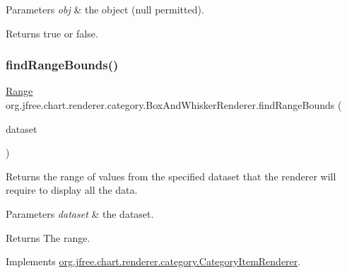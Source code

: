 \begin{DoxyParams}{Parameters}
{\em obj} & the object ({\ttfamily null} permitted).\\
\hline
\end{DoxyParams}
\begin{DoxyReturn}{Returns}
{\ttfamily true} or {\ttfamily false}. 
\end{DoxyReturn}
\mbox{\label{classorg_1_1jfree_1_1chart_1_1renderer_1_1category_1_1_box_and_whisker_renderer_a75d2ee53086dc5242430580069ab9370}} 
\subsubsection{\texorpdfstring{find\+Range\+Bounds()}{findRangeBounds()}}
{\footnotesize\ttfamily \mbox{\hyperlink{classorg_1_1jfree_1_1data_1_1_range}{Range}} org.\+jfree.\+chart.\+renderer.\+category.\+Box\+And\+Whisker\+Renderer.\+find\+Range\+Bounds (\begin{DoxyParamCaption}\item[{\mbox{\hyperlink{interfaceorg_1_1jfree_1_1data_1_1category_1_1_category_dataset}{Category\+Dataset}}}]{dataset }\end{DoxyParamCaption})}

Returns the range of values from the specified dataset that the renderer will require to display all the data.


\begin{DoxyParams}{Parameters}
{\em dataset} & the dataset.\\
\hline
\end{DoxyParams}
\begin{DoxyReturn}{Returns}
The range. 
\end{DoxyReturn}


Implements \mbox{\hyperlink{interfaceorg_1_1jfree_1_1chart_1_1renderer_1_1category_1_1_category_item_renderer_aa7294c25a26ffd1725d7920a6041a785}{org.\+jfree.\+chart.\+renderer.\+category.\+Category\+Item\+Renderer}}.

